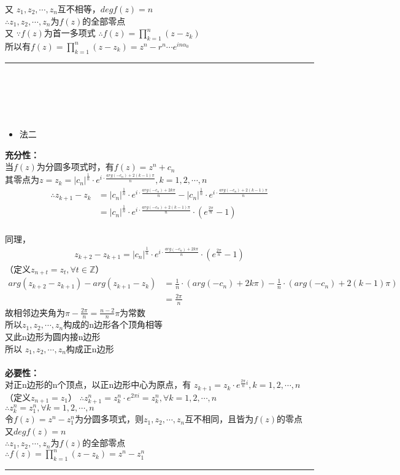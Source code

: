 \documentclass[18pt]{article}
\begin{document}
又 $z_{1},z_{2},\cdots,z_{n}$互不相等，$degf(z)=n$\\
$\therefore z_{1},z_{2},\cdots,z_{n}$为$f(z)$的全部零点\\
又 $\because f(z)$为首一多项式
$\therefore f(z)=\prod_{k=1}^{n}(z-z_{k})$\\
所以有$f(z)=\prod_{k=1}^{n}(z-z_{k})=z^{n}-r^{n}\cdots e^{in\alpha_{0}}$ \quad \rule{3mm}{3mm}\\
\\
\\
\\
\begin{itemize}
	\item 法二
\end{itemize}
\textbf{充分性：}\\
当$f(z)$为分圆多项式时，有$f(z)=z^{n}+c_{n}$\\
其零点为$z=z_{k}=|c_{n}|^{\frac{1}{n}}\cdot e^{i\cdot\frac{arg(-c_{n})+2(k-1)\pi}{n}},k=1,2,\cdots,n$\\
\begin{align*}
\therefore z_{k+1}-z_{k} &=|c_{n}|^{\frac{1}{n}}\cdot e^{i\cdot\frac{arg(-c_{n})+2k\pi}{n}}-|c_{n}|^{\frac{1}{n}}\cdot e^{i\cdot\frac{arg(-c_{n})+2(k-1)\pi}{n}} \\
&=|c_{n}|^{\frac{1}{n}}\cdot e^{i\cdot\frac{arg(-c_{n})+2(k-1)\pi}{n}} \cdot (e^{\frac{2\pi}{n}}-1)
\end{align*}\\
同理，
\begin{align*}
z_{k+2}-z_{k+1}=|c_{n}|^{\frac{1}{n}}\cdot e^{i\cdot\frac{arg(-c_{n})+2k\pi}{n}} \cdot (e^{\frac{2\pi}{n}}-1)
\end{align*}
（定义$z_{n+t}=z_{t},\forall t \in \mathbb{Z}$）
\begin{align*}
	arg(z_{k+2}-z_{k+1})-arg(z_{k+1}-z_{k})&=\frac{1}{n}\cdot (arg(-c_{n})+2k\pi)-\frac{1}{n}\cdot (arg(-c_{n})+2(k-1)\pi)\\
	&=\frac{2\pi}{n}
\end{align*}
故相邻边夹角为$\pi-\frac{2\pi}{n}=\frac{n-2}{n}\pi$为常数\\
所以\quad$z_{1},z_{2},\cdots,z_{n}$构成的n边形各个顶角相等\\
又\quad 此n边形为圆内接n边形\\
所以 $z_{1},z_{2},\cdots,z_{n}$构成正n边形\\
\\
\textbf{必要性：}\\
对正n边形的n个顶点，以正n边形中心为原点，有
$z_{k+1}=z_{k}\cdot e^{\frac{2\pi}{n}i},k=1,2,\cdots,n$\\
（定义$z_{n+1}=z_{1}$）
$\therefore z_{k+1}^{n}=z_{k}^{n}\cdot e^{2\pi i}=z_{k}^{n},\forall k=1,2,\cdots,n$\\
$\therefore z_{k}^{n}=z_{1}^{n},\forall k=1,2,\cdots,n$\\
令$f(z)=z^{n}-z_{1}^{n}$为分圆多项式，则$z_{1},z_{2},\cdots,z_{n}$互不相同，且皆为$f(z)$的零点\\
又\quad $degf(z)=n$\\
$\therefore z_{1},z_{2},\cdots,z_{n}$为$f(z)$的全部零点\\
$\therefore f(z)=\prod_{k=1}^{n}(z-z_{k})=z^{n}-z_{1}^{n}$ \quad \rule{3mm}{3mm}\\
\end{document}
